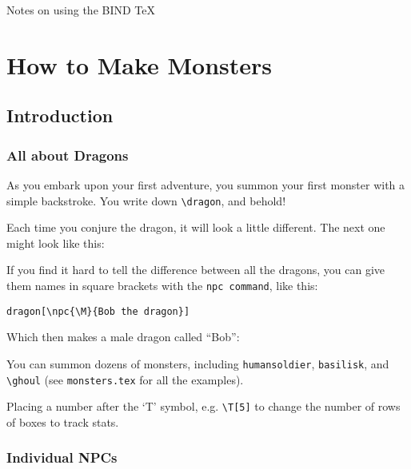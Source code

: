 \documentclass[a4paper,openany]{book}
\date{\today}
\begin{document}
\frontpage%
  {Notes on using the BIND \TeX}%

\chapter{How to Make Monsters}
\mainmatter

\section{Introduction}

\begin{multicols}{2}

\subsection{All about Dragons}

\begin{boxtext}

As you embark upon your first adventure, you summon your first monster with a simple backstroke.
You write down \verb"\dragon", and behold!

\end{boxtext}


Each time you conjure the dragon, it will look a little different.
The next one might look like this:

\dragon

If you find it hard to tell the difference between all the dragons, you can give them names in square brackets with the \verb"npc command", like this:

\verb"dragon[\npc{\M}{Bob the dragon}]"

Which then makes a male dragon called ``Bob'':


You can summon dozens of monsters, including \verb"humansoldier", \verb"basilisk", and \verb"\ghoul"
(see \verb"monsters.tex" for all the examples).

Placing a number after the `T' symbol, e.g. \verb"\T[5]" to change the number of rows of boxes to track stats.


\subsection{Individual NPCs}


\end{multicols}
\end{document}
